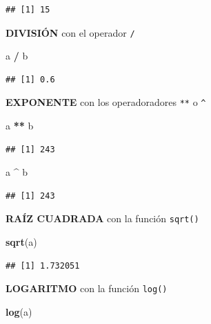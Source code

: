 \documentclass[
]{book}
\newenvironment{Shaded}{\begin{snugshade}}{\end{snugshade}}
\newcommand{\FunctionTok}[1]{\textcolor[rgb]{0.13,0.29,0.53}{\textbf{#1}}}
\newcommand{\NormalTok}[1]{#1}
\newcommand{\SpecialCharTok}[1]{\textcolor[rgb]{0.81,0.36,0.00}{\textbf{#1}}}
\begin{document}
\begin{verbatim}
## [1] 15
\end{verbatim}

\textbf{DIVISIÓN} con el operador \texttt{/}

\begin{Shaded}
\begin{Highlighting}[]
\NormalTok{a }\SpecialCharTok{/}\NormalTok{ b}
\end{Highlighting}
\end{Shaded}

\begin{verbatim}
## [1] 0.6
\end{verbatim}

\textbf{EXPONENTE} con los operadoradores \texttt{**} o \texttt{\^{}}

\begin{Shaded}
\begin{Highlighting}[]
\NormalTok{a }\SpecialCharTok{**}\NormalTok{ b}
\end{Highlighting}
\end{Shaded}

\begin{verbatim}
## [1] 243
\end{verbatim}

\begin{Shaded}
\begin{Highlighting}[]
\NormalTok{a }\SpecialCharTok{\^{}}\NormalTok{ b}
\end{Highlighting}
\end{Shaded}

\begin{verbatim}
## [1] 243
\end{verbatim}

\textbf{RAÍZ CUADRADA} con la función \texttt{sqrt()}

\begin{Shaded}
\begin{Highlighting}[]
\FunctionTok{sqrt}\NormalTok{(a)}
\end{Highlighting}
\end{Shaded}

\begin{verbatim}
## [1] 1.732051
\end{verbatim}

\textbf{LOGARITMO} con la función \texttt{log()}

\begin{Shaded}
\begin{Highlighting}[]
\FunctionTok{log}\NormalTok{(a)}
\end{Highlighting}
\end{Shaded}
\end{document}
